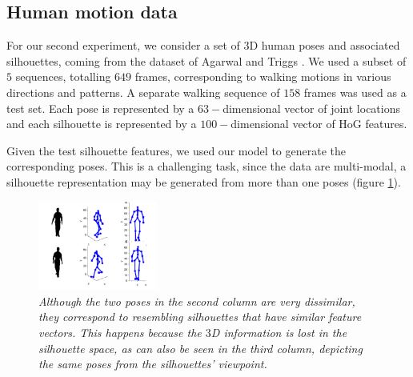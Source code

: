 


\subsection{Human motion data}

For our second experiment, we consider 
a set of $3$D human poses and associated silhouettes,
coming from the dataset of Agarwal and Triggs \cite{Agarwal:pose06}. We used a subset of
$5$ sequences, totalling $649$ frames, corresponding to walking motions in various directions and patterns.
A separate walking sequence of $158$ frames was used as a test set.
Each pose is represented by a $63-$dimensional vector
of joint locations and each
silhouette is represented by a $100-$dimensional vector of HoG features.

\par Given the test silhouette features, we used our model to generate the corresponding
poses. This is a challenging task, since the data are multi-modal, \ie a silhouette representation
may be generated from more than one poses (\eg figure \ref{fig:humanPoseAmbiguity}). 

\begin{figure}[ht]
\begin{center}
  \includegraphics[width=0.35\textwidth]{../diagrams/humanPose/newAmbiguity}
\end{center}
\vspace{-9pt}
\caption{\small{ \it
Although the two poses in the second column are very dissimilar, they correspond to resembling silhouettes
that have similar feature vectors. This happens because the $3$D information is lost in the silhouette space,
as can also be seen in the third column, depicting the same poses from the silhouettes' viewpoint.}}
\label{fig:humanPoseAmbiguity}
\vspace{-4pt}
\end{figure}

